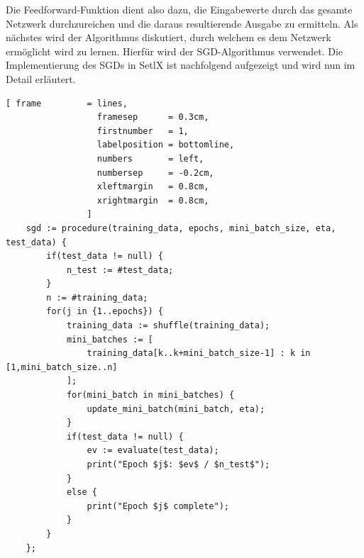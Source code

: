 \noindent
Die Feedforward-Funktion dient also dazu, die Eingabewerte durch das gesamte Netzwerk durchzureichen und die daraus resultierende Ausgabe zu ermitteln. Als nächstes wird der Algorithmus diskutiert, durch welchem es dem Netzwerk ermöglicht wird zu \glqq lernen\grqq. Hierfür wird der SGD-Algorithmus verwendet. Die Implementierung des SGDs in SetlX ist nachfolgend aufgezeigt und wird nun im Detail erläutert.

\begin{Verbatim}[ frame         = lines, 
                  framesep      = 0.3cm, 
                  firstnumber   = 1,
                  labelposition = bottomline,
                  numbers       = left,
                  numbersep     = -0.2cm,
                  xleftmargin   = 0.8cm,
                  xrightmargin  = 0.8cm,
                ]
    sgd := procedure(training_data, epochs, mini_batch_size, eta, test_data) {
        if(test_data != null) {
            n_test := #test_data; 		
        }
        n := #training_data;		
        for(j in {1..epochs}) {
            training_data := shuffle(training_data);
            mini_batches := [ 
                training_data[k..k+mini_batch_size-1] : k in [1,mini_batch_size..n] 
            ];		
            for(mini_batch in mini_batches) {
                update_mini_batch(mini_batch, eta);
            } 		
            if(test_data != null) {
                ev := evaluate(test_data);
                print("Epoch $j$: $ev$ / $n_test$");
            }
            else {
                print("Epoch $j$ complete");
            }
        }
    };
\end{Verbatim}
